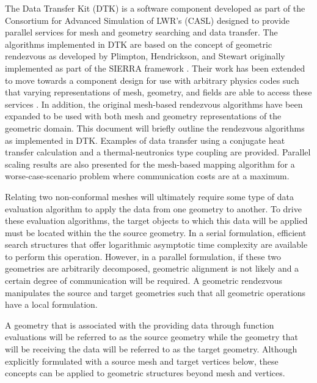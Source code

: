 \documentclass{mc2013}
\begin{document}
The Data Transfer Kit (DTK) is a software component developed as part
of the Consortium for Advanced Simulation of LWR's (CASL)
\cite{u.s._department_of_energy_casl_2011} designed to provide
parallel services for mesh and geometry searching and data
transfer. The algorithms implemented in DTK are based on the concept
of geometric rendezvous as developed by Plimpton, Hendrickson, and
Stewart \cite{Plimpton_2004} originally implemented as part of the
SIERRA framework \cite{Stewart_2004}. Their work has been extended to
move towards a component design for use with arbitrary physics codes
such that varying representations of mesh, geometry, and fields are
able to access these services \cite{Chand_2008}. In addition, the
original mesh-based rendezvous algorithms have been expanded to be
used with both mesh and geometry representations of the geometric
domain. This document will briefly outline the rendezvous algorithms
as implemented in DTK. Examples of data transfer using a conjugate
heat transfer calculation and a thermal-neutronics type coupling are
provided. Parallel scaling results are also presented for the
mesh-based mapping algorithm for a worse-case-scenario problem where
communication costs are at a maximum.


\label{sec:geometric_rendezvous}

Relating two non-conformal meshes will ultimately require some type of
data evaluation algorithm to apply the data from one geometry to
another. To drive these evaluation algorithms, the target objects to
which this data will be applied must be located within the the source
geometry. In a serial formulation, efficient search structures that
offer logarithmic asymptotic time complexity are available to perform
this operation. However, in a parallel formulation, if these two
geometries are arbitrarily decomposed, geometric alignment is not
likely and a certain degree of communication will be required. A
geometric rendezvous manipulates the source and target geometries such
that all geometric operations have a local formulation.

A geometry that is associated with the providing data through function
evaluations will be referred to as the source geometry while the
geometry that will be receiving the data will be referred to as the
target geometry. Although explicitly formulated with a source mesh and
target vertices below, these concepts can be applied to geometric
structures beyond mesh and vertices.
\end{document}
